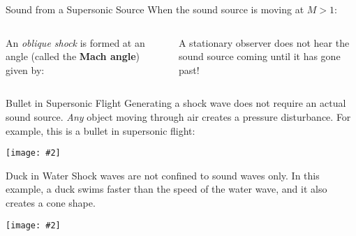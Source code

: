 \documentclass[12pt,aspectratio=169]{beamer}
\newcommand{\pic}[2]{\texttt{[image: \#2]}}
\newcommand{\eq}[2]{\vspace{#1}{\Large\begin{displaymath}#2\end{displaymath}}}
\begin{document}
\begin{frame}{Sound from a Supersonic Source}
  When the sound source is moving at $M>1$:
  \begin{columns}
      
    An \emph{oblique shock} is formed at an angle (called the
    \textbf{Mach angle}) given by:
      
    \eq{-.2in}{
      \gamma=\sin^{-1}\left(\frac{1}{M}\right)
    }

    \vspace{-.15in}A stationary observer does not hear the sound source coming
    until it has gone past!
  \end{columns}
\end{frame}


\begin{frame}{Bullet in Supersonic Flight}
  Generating a shock wave does not require an actual sound source. \emph{Any}
  object moving through air creates a pressure disturbance. For example, this
  is a bullet in supersonic flight:
  \begin{center}
    \pic{.3}{bullet2.jpg}
  \end{center}
\end{frame}


\begin{frame}{Duck in Water}
  Shock waves are not confined to sound waves only. In this example, a duck
  swims faster than the speed of the water wave, and it also creates a cone
  shape.
  \begin{center}
    \pic{.5}{duck.jpg}
  \end{center}
\end{frame}
\end{document}
